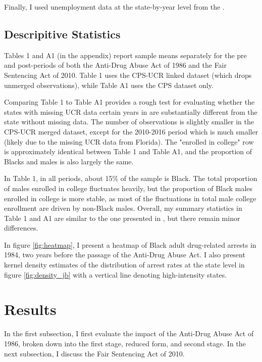 \documentclass{article}
\begin{document}
Finally, I used unemployment data at the state-by-year level from the \cite{unemployment_data}. 

\subsection{Descripitive Statistics}

Tables 1 and A1 (in the appendix) report sample means separately for the pre and post-periods of both the Anti-Drug Abuse Act of 1986 and the Fair Sentencing Act of 2010. Table 1 uses the CPS-UCR linked dataset (which drops unmerged observations), while Table A1 uses the CPS dataset only. 

Comparing Table 1 to Table A1 provides a rough test for evaluating whether the states with missing UCR data certain years in are substantially different from the state without missing data. The number of observations is slightly smaller in the CPS-UCR merged dataset, except for the 2010-2016 period which is much smaller (likely due to the missing UCR data from Florida). The "enrolled in college" row is approximately identical between Table 1 and Table A1, and the proportion of Blacks and males is also largely the same.

In Table 1, in all periods, about 15\% of the sample is Black. The total proportion of males enrolled in college fluctuates heavily, but the proportion of Black males enrolled in college is more stable, as most of the fluctuations in total male college enrollment are driven by non-Black males. Overall, my summary statistics in Table 1 and A1 are similar to the one presented in \cite{britton2022}, but there remain minor differences.

In figure \ref{fig:heatmap}, I present a heatmap of Black adult drug-related arrests in 1984, two years before the passage of the Anti-Drug Abuse Act. I also present kernel density estimates of the distribution of arrest rates at the state level in figure \ref{fig:density_jb} with a vertical line denoting high-intensity states.

\section{Results}

In the first subsection, I first evaluate the impact of the Anti-Drug Abuse Act of 1986, broken down into the first stage, reduced form, and second stage. In the next subsection, I discuss the Fair Sentencing Act of 2010.
\end{document}
